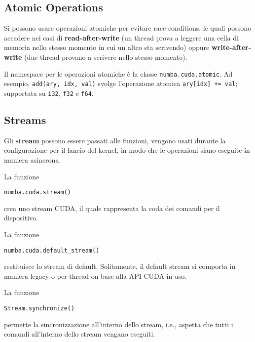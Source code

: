 \subsection{Atomic Operations}

Si possono usare operazioni atomiche per evitare race conditions, le quali possono accadere nei casi di \textbf{read-after-write} (un thread prova a leggere una cella di memoria nello stesso momento in cui un altro sta scrivendo) oppure \textbf{write-after-write} (due thread provano a scrivere nello stesso momento).

Il namespace per le operazioni atomiche è la classe \texttt{numba.cuda.atomic}. Ad esempio, \texttt{add(ary, idx, val)} svolge l'operazione atomica \texttt{ary[idx] += val}; supportata su \texttt{i32}, \texttt{f32} e \texttt{f64}.

\subsection{Streams}

Gli \textbf{stream} possono essere passati alle funzioni, vengono usati durante la configurazione per il lancio del kernel, in modo che le operazioni siano eseguite in maniera asincrona.

La funzione 
\begin{verbatim}
numba.cuda.stream()
\end{verbatim}
crea uno stream CUDA, il quale rappresenta la coda dei comandi per il dispositivo.

La funzione
\begin{verbatim}
numba.cuda.default_stream()
\end{verbatim}
restituisce lo stream di default. Solitamente, il default stream si comporta in maniera legacy o per-thread on base alla API CUDA in uso.

La funzione
\begin{verbatim}
Stream.synchronize()
\end{verbatim}
permette la sincronizzazione all'interno dello stream, i.e., aspetta che tutti i comandi all'interno dello stream vengano eseguiti.


